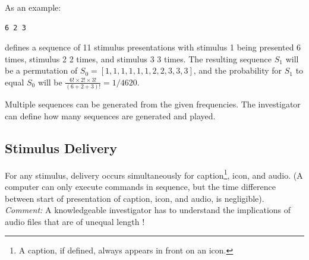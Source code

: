 \documentclass[letterpaper,oneside,12pt]{article}
\begin{document}
As an example: 
\begin{verbatim} 
6 2 3
\end{verbatim} 
defines a sequence of 11 stimulus presentations with stimulus 1 being presented 6
times, stimulus 2 2 times, and stimulus 3 3 times. The resulting sequence $S_1$ will
be a permutation of $S_0 = [1, 1, 1, 1, 1, 1, 2, 2, 3, 3, 3]$, and the probability
for $S_1$ to equal $S_0$ will be
$\frac{6!\times2!\times3!}{(6+2+3)!}=1/4620$.

Multiple sequences can be generated from the given frequencies.
The investigator can define how many sequences are generated and played.

\subsection{Stimulus Delivery}

For any stimulus, delivery occurs simultaneously for caption\footnote{A caption, 
if defined, always appears in front on an icon.}, icon, and audio. (A computer 
can only execute commands in sequence, but the time difference between start of 
presentation of caption, icon, and audio, is negligible). \emph{Comment:} A 
knowledgeable investigator has to understand the implications of audio files 
that are of unequal length !
\end{document}
